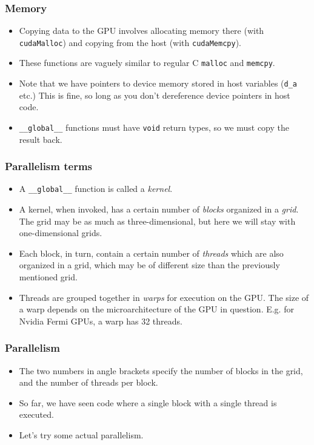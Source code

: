 \begin{frame}
  \frametitle{Memory}
  \begin{itemize}
  \item Copying data to the GPU involves allocating memory there (with
    \texttt{cudaMalloc}) and copying from the host (with \texttt{cudaMemcpy}).
  \item These functions are vaguely similar to regular C \texttt{malloc} and
    \texttt{memcpy}.
  \item Note that we have pointers to device memory stored in host variables
    (\texttt{d\_a} etc.) This is fine, so long as you don't dereference device
    pointers in host code.
  \item \texttt{\_\_global\_\_} functions must have \texttt{void} return types,
    so we must copy the result back.
  \end{itemize}
\end{frame}

\begin{frame}
  \frametitle{Parallelism terms}
  \begin{itemize}
  \item A \texttt{\_\_global\_\_} function is called a \emph{kernel}.
  \item A kernel, when invoked, has a certain number of \emph{blocks} organized
    in a \emph{grid}. The grid may be as much as three-dimensional, but here we
    will stay with one-dimensional grids.
  \item Each block, in turn, contain a certain number of \emph{threads} which
    are also organized in a grid, which may be of different size than the
    previously mentioned grid.
  \item Threads are grouped together in \emph{warps} for execution on the GPU.
    The size of a warp depends on the microarchitecture of the GPU in question.
    E.g. for Nvidia Fermi GPUs, a warp has 32 threads.
  \end{itemize}
\end{frame}

\begin{frame}
  \frametitle{Parallelism}
  \begin{itemize}
  \item The two numbers in angle brackets specify the number of blocks in the
    grid, and the number of threads per block.
  \item So far, we have seen code where a single block with a single thread is
    executed.
  \item Let's try some actual parallelism.
  \end{itemize}
\end{frame}

